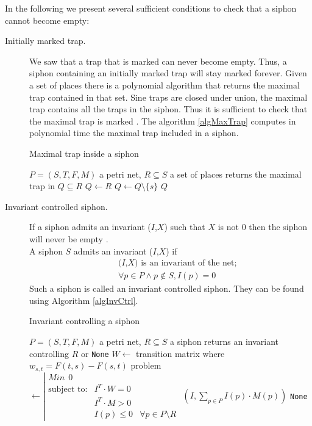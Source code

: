 \documentclass[a4paper]{report}
\numberwithin{algorithm}{chapter}
\begin{document}
In the following we present several sufficient conditions to check that a siphon cannot become empty:
\begin{description}
\item[Initially marked trap.] 
We saw that a trap that is marked can never become empty.
Thus, a siphon containing an initially marked trap will stay marked forever.
Given a set of places there is a polynomial algorithm that returns the maximal trap contained in that set.
Sine traps are closed under union, the maximal trap contains all the traps in the siphon.
Thus it is sufficient to check that the maximal trap is marked \cite{Commoner72,fcbook}.
The algorithm \ref{algMaxTrap} computes in polynomial time the maximal trap included in a siphon.

\begin{algorithm}
\caption{Maximal trap inside a siphon}
\label{algMaxTrap}
\begin{algorithmic}
\REQUIRE $P = (S,T,F,M)$ a petri net, $R \subseteq S$ a set of places %
\ENSURE returns the maximal trap in $Q \subseteq R$ %
\STATE $Q \leftarrow R$
\STATE $Q \leftarrow Q \setminus \{s\}$
\ENDWHILE
\RETURN $Q$
\end{algorithmic}
\end{algorithm}

\item[Invariant controlled siphon.]
If a siphon admits an invariant ($I$,$X$) such that $X$ is not 0 then the siphon will never be empty \cite{DBLP:conf/apn/LautenbachR94,DBLP:journals/tsmc/LiZ08}.\\
A siphon $S$ admits an invariant ($I$,$X$) if 
\begin{eqnarray}
&&\text{($I$,$X$) is an invariant of the net;}\\
&&\label{inv_ctrl_siphon} \forall p \in P \land p \notin S, I(p) = 0
\end{eqnarray}
Such a siphon is called an invariant controlled siphon.
They can be found using Algorithm \ref{algInvCtrl}.

\begin{algorithm}
\caption{Invariant controlling a siphon}
\label{algInvCtrl}
\begin{algorithmic}
\REQUIRE $P = (S,T,F,M)$ a petri net, $R \subseteq S$ a siphon %
\ENSURE returns an invariant controlling $R$ or \texttt{None} %
\STATE $W \leftarrow $ transition matrix where $w_{s,t} = F(t,s) - F(s,t)$
\STATE problem $\leftarrow \left|
\begin{array}{lrl}
Min ~~ 0 & &\\
\text{subject to:} & I^T \cdot W = 0 & \\
 & I^T \cdot M > 0 & \\
 & I(p) \leq 0 & \forall p \in P \setminus R
\end{array} \right.$
\RETURN $(I, \sum_{p \in P} I(p) \cdot M(p) )$
\ELSE
\RETURN \texttt{None}
\ENDIF 
\end{algorithmic}
\end{algorithm}


\end{description}
\end{document}
